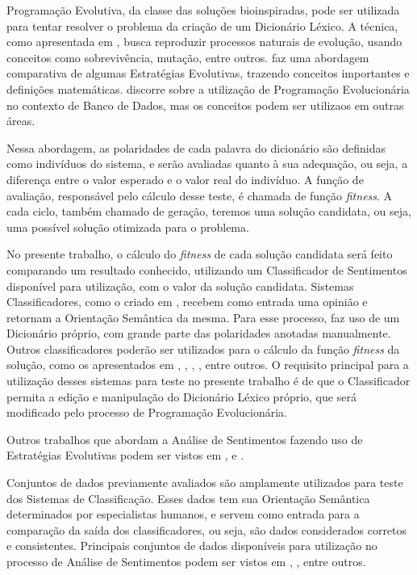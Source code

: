 \documentclass[a4paper,11pt]{article}
\begin{document}
Programação Evolutiva, da classe das soluções bioinspiradas, pode ser utilizada para tentar resolver o problema da criação de um Dicionário Léxico. A técnica, como apresentada em \cite{Fogel2000}, busca reproduzir processos naturais de evolução, usando conceitos como sobrevivência, mutação, entre outros. \cite{back} faz uma abordagem comparativa de algumas Estratégias Evolutivas, trazendo conceitos importantes e definições matemáticas. \cite{silveirageraccao} discorre sobre a utilização de Programação Evolucionária no contexto de Banco de Dados, mas os conceitos podem ser utilizaos em outras áreas. 

Nessa abordagem, as polaridades de cada palavra do dicionário são definidas como indivíduos do sistema, e serão avaliadas quanto à sua adequação, ou seja, a diferença entre o valor esperado e o valor real do indivíduo. A função de avaliação, responsável pelo cálculo desse teste, é chamada de função \emph{fitness}. A cada ciclo, também chamado de geração, teremos uma solução candidata, ou seja, uma possível solução otimizada para o problema.

No presente trabalho, o cálculo do \emph{fitness} de cada solução candidata será feito comparando um resultado conhecido, utilizando um Classificador de Sentimentos disponível para utilização, com o valor da solução candidata. Sistemas Classificadores, como o criado em \cite{Rodrigues2016}, recebem como entrada uma opinião e retornam a Orientação Semântica da mesma. Para esse processo, \cite{Rodrigues2016} faz uso de um Dicionário próprio, com grande parte das polaridades anotadas manualmente. Outros classificadores poderão ser utilizados para o cálculo da função \emph{fitness} da solução, como os apresentados em \cite{Pang2002}, \cite{Zhou2014}, \cite{silva2010automatic}, \cite{kdir16}, entre outros. O requisito principal para a utilização desses sistemas para teste no presente trabalho é de que o Classificador permita a edição e manipulação do Dicionário Léxico próprio, que será modificado pelo processo de Programação Evolucionária.

Outros trabalhos que abordam a Análise de Sentimentos fazendo uso de Estratégias Evolutivas podem ser vistos em \cite{ferreira2015using}, \cite{vohra2013comparative} e \cite{HADDI2013}.

Conjuntos de dados previamente avaliados são amplamente utilizados para teste dos Sistemas de Classificação. Esses dados tem sua Orientação Semântica determinados por especialistas humanos, e servem como entrada para a comparação da saída dos classificadores, ou seja, são dados considerados corretos e consistentes. Principais conjuntos de dados disponíveis para utilização no processo de Análise de Sentimentos podem ser vistos em \cite{Iqbal}, \cite{taboada2011lexicon}, entre outros. 
\end{document}
